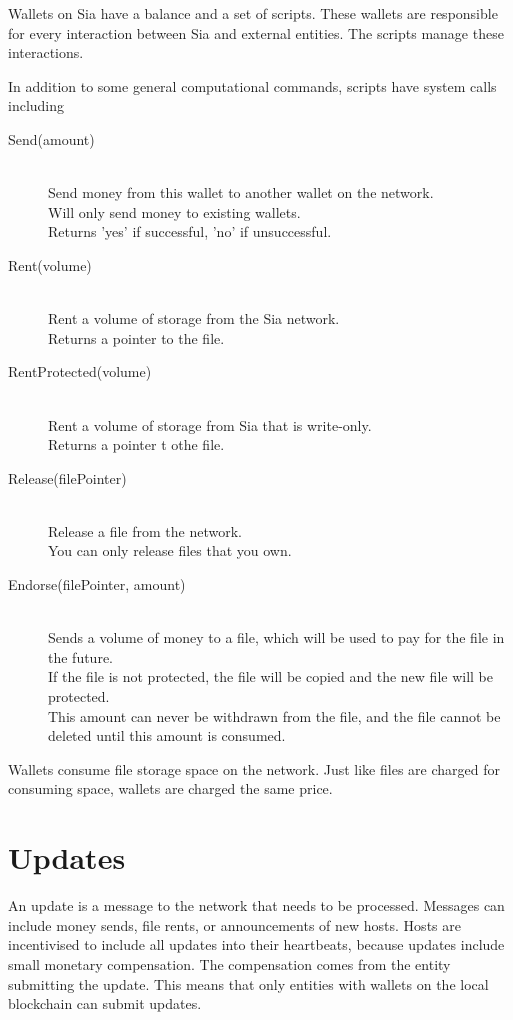 \documentclass[twocolumn]{article}
\begin{document}
Wallets on Sia have a balance and a set of scripts.
These wallets are responsible for every interaction between Sia and external entities.
The scripts manage these interactions.

In addition to some general computational commands, scripts have system calls including

\begin{description}
	\item[Send(amount)] \hfill \\
	Send money from this wallet to another wallet on the network. \\
	Will only send money to existing wallets. \\
	Returns 'yes' if successful, 'no' if unsuccessful.
	\item[Rent(volume)] \hfill \\
	Rent a volume of storage from the Sia network. \\
	Returns a pointer to the file.
	\item[RentProtected(volume)] \hfill \\
	Rent a volume of storage from Sia that is write-only. \\
	Returns a pointer t othe file.
	\item[Release(filePointer)] \hfill \\
	Release a file from the network. \\
	You can only release files that you own.
	\item[Endorse(filePointer, amount)] \hfill \\
	Sends a volume of money to a file, which will be used to pay for the file in the future. \\
	If the file is not protected, the file will be copied and the new file will be protected. \\
	This amount can never be withdrawn from the file, and the file cannot be deleted until this amount is consumed.
\end{description}

Wallets consume file storage space on the network.
Just like files are charged for consuming space, wallets are charged the same price.

\section{Updates}

An update is a message to the network that needs to be processed.
Messages can include money sends, file rents, or announcements of new hosts.
Hosts are incentivised to include all updates into their heartbeats, because updates include small monetary compensation.
The compensation comes from the entity submitting the update.
This means that only entities with wallets on the local blockchain can submit updates.
\end{document}
